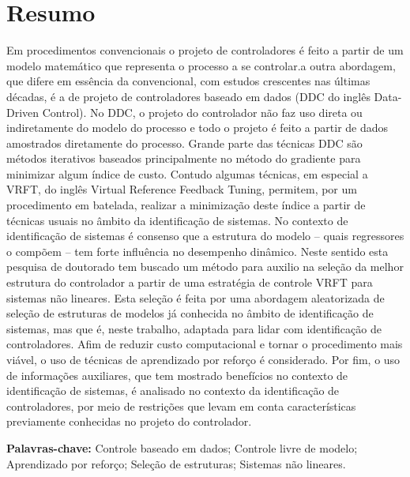 
\chapter*{Resumo}

\vspace{-2cm} 


Em procedimentos convencionais o projeto de controladores é feito a partir de um modelo matemático que representa o processo a se controlar.a outra abordagem, que difere em essência da convencional, com estudos crescentes nas últimas décadas, é a de projeto de controladores baseado em dados (DDC do inglês Data-Driven Control). No DDC, o projeto do controlador não faz uso direta ou indiretamente do modelo do processo e todo o projeto é feito a partir de dados amostrados diretamente do processo. Grande parte das técnicas DDC são métodos iterativos baseados principalmente no método do gradiente para minimizar algum índice de custo. Contudo algumas técnicas, em especial a VRFT, do inglês Virtual Reference Feedback Tuning, permitem, por um procedimento em batelada, realizar a minimização deste índice a partir de técnicas usuais no âmbito da identificação de sistemas. No contexto de identificação de sistemas é consenso que a estrutura do modelo – quais regressores o compõem – tem forte influência no desempenho dinâmico. Neste sentido esta pesquisa de doutorado tem buscado um método para auxilio na seleção da melhor estrutura do controlador a partir de uma estratégia de controle VRFT para sistemas não lineares. Esta seleção é feita por uma abordagem aleatorizada de seleção de estruturas de modelos já conhecida no âmbito de identificação de sistemas, mas que é, neste trabalho, adaptada para lidar com identificação de controladores. Afim de reduzir custo computacional e tornar o procedimento mais viável, o uso de técnicas de aprendizado por reforço é considerado. Por fim, o uso de informações auxiliares, que tem mostrado benefícios no contexto de identificação de sistemas, é analisado no contexto da identificação de controladores, por meio de restrições que levam em conta características previamente conhecidas no projeto do controlador.



\textbf{Palavras-chave:} Controle baseado em dados; Controle livre de modelo; Aprendizado por reforço; Seleção de estruturas; Sistemas não lineares.
